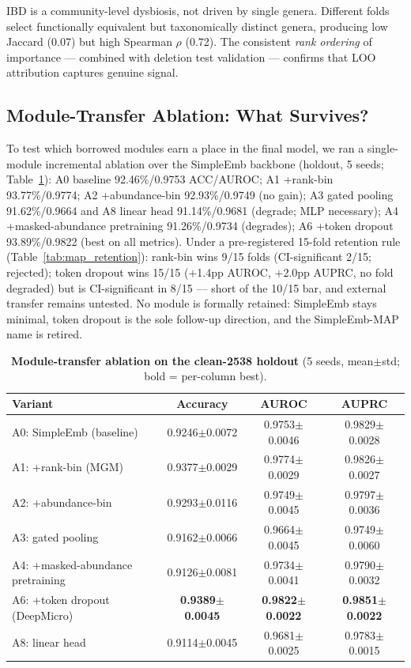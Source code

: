 \documentclass[11pt,a4paper]{article}
\begin{document}
IBD is a community-level dysbiosis, not driven by single genera. Different folds select functionally equivalent but taxonomically distinct genera, producing low Jaccard (0.07) but high Spearman $\rho$ (0.72). The consistent \textit{rank ordering} of importance --- combined with deletion test validation --- confirms that LOO attribution captures genuine signal.

\subsection{Module-Transfer Ablation: What Survives?}

To test which borrowed modules earn a place in the final model, we ran a single-module incremental ablation over the SimpleEmb backbone (holdout, 5 seeds; Table~\ref{tab:map_ablation}): A0 baseline 92.46\%/0.9753 ACC/AUROC; A1 +rank-bin 93.77\%/0.9774; A2 +abundance-bin 92.93\%/0.9749 (no gain); A3 gated pooling 91.62\%/0.9664 and A8 linear head 91.14\%/0.9681 (degrade; MLP necessary); A4 +masked-abundance pretraining 91.26\%/0.9734 (degrades); A6 +token dropout 93.89\%/0.9822 (best on all metrics). Under a pre-registered 15-fold retention rule (Table~\ref{tab:map_retention}): rank-bin wins 9/15 folds (CI-significant 2/15; rejected); token dropout wins 15/15 ($+$1.4pp AUROC, $+$2.0pp AUPRC, no fold degraded) but is CI-significant in 8/15 --- short of the 10/15 bar, and external transfer remains untested. No module is formally retained: SimpleEmb stays minimal, token dropout is the sole follow-up direction, and the SimpleEmb-MAP name is retired.

\begin{table}[ht]
\centering
\caption{\textbf{Module-transfer ablation on the clean-2538 holdout} (5 seeds, mean$\pm$std; bold = per-column best).}
\label{tab:map_ablation}
\begin{tabular}{lccc}
\toprule
Variant & Accuracy & AUROC & AUPRC \\
\midrule
A0: SimpleEmb (baseline) & 0.9246$\pm$0.0072 & 0.9753$\pm$0.0046 & 0.9829$\pm$0.0028 \\
A1: +rank-bin (MGM) & 0.9377$\pm$0.0029 & 0.9774$\pm$0.0029 & 0.9826$\pm$0.0027 \\
A2: +abundance-bin & 0.9293$\pm$0.0116 & 0.9749$\pm$0.0045 & 0.9797$\pm$0.0036 \\
A3: gated pooling & 0.9162$\pm$0.0066 & 0.9664$\pm$0.0045 & 0.9749$\pm$0.0060 \\
A4: +masked-abundance pretraining & 0.9126$\pm$0.0081 & 0.9734$\pm$0.0041 & 0.9790$\pm$0.0032 \\
A6: +token dropout (DeepMicro) & \textbf{0.9389$\pm$0.0045} & \textbf{0.9822$\pm$0.0022} & \textbf{0.9851$\pm$0.0022} \\
A8: linear head & 0.9114$\pm$0.0045 & 0.9681$\pm$0.0025 & 0.9783$\pm$0.0015 \\
\bottomrule
\end{tabular}
\end{table}
\end{document}
